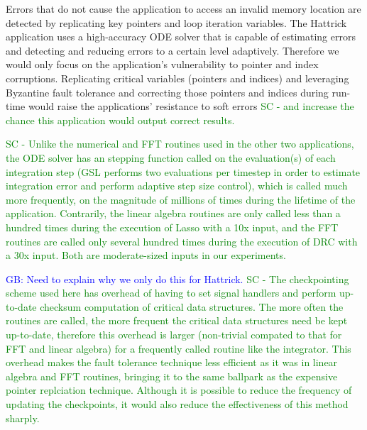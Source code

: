 \documentclass{sig-alternate}
\newcommand{\sui}[1]{%
  \textcolor{green}{SC - #1}
}
\newcommand{\greg}[1]{%
  \textcolor{blue}{GB: #1}
}
\begin{document}
Errors that do not cause the application to access an invalid memory location are detected by replicating key pointers and loop iteration variables.
The Hattrick application uses a high-accuracy ODE solver that is capable of estimating errors and detecting and reducing errors to a certain level adaptively.
Therefore we would only focus on the application's vulnerability to pointer and index corruptions.
Replicating critical variables (pointers and indices) and leveraging Byzantine fault tolerance and correcting those pointers and indices during run-time would raise the applications' resistance to soft errors \sui{and increase the chance this application would output correct results.}

\sui{Unlike the numerical and FFT routines used in the other two applications, the ODE solver has an stepping function called on the evaluation(s) of each integration step (GSL performs two evaluations per timestep in order to estimate integration error and perform adaptive step size control), which is called much more frequently, on the magnitude of millions of times during the lifetime of the application. Contrarily, the linear algebra routines are only called less than a hundred times during the execution of Lasso with a 10x input, and the FFT routines are called only several hundred times during the execution of DRC with a 30x input. Both are moderate-sized inputs in our experiments.}

\greg{Need to explain why we only do this for Hattrick.} \sui{The checkpointing scheme used here has overhead of having to set signal handlers and perform up-to-date checksum computation of critical data structures. The more often the routines are called, the more frequent the critical data structures need be kept up-to-date, therefore this overhead is larger (non-trivial compated to that for FFT and linear algebra) for a frequently called routine like the integrator. This overhead makes the fault tolerance technique less efficient as it was in linear algebra and FFT routines, bringing it to the same ballpark as the expensive pointer replciation technique. Although it is possible to reduce the frequency of updating the checkpoints, it would also reduce the effectiveness of this method sharply.}
\end{document}
